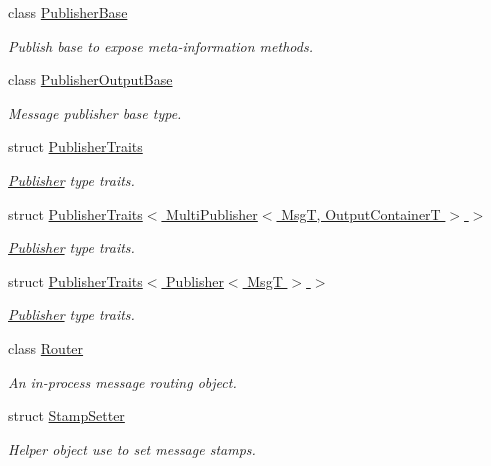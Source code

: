 \begin{DoxyCompactItemize}
class \hyperlink{classflow__ros_1_1_publisher_base}{Publisher\+Base}
\begin{DoxyCompactList}\small\item\em Publish base to expose meta-\/information methods. \end{DoxyCompactList}\item 
class \hyperlink{classflow__ros_1_1_publisher_output_base}{Publisher\+Output\+Base}
\begin{DoxyCompactList}\small\item\em Message publisher base type. \end{DoxyCompactList}\item 
struct \hyperlink{structflow__ros_1_1_publisher_traits}{Publisher\+Traits}
\begin{DoxyCompactList}\small\item\em \hyperlink{classflow__ros_1_1_publisher}{Publisher} type traits. \end{DoxyCompactList}\item 
struct \hyperlink{structflow__ros_1_1_publisher_traits_3_01_multi_publisher_3_01_msg_t_00_01_output_container_t_01_4_01_4}{Publisher\+Traits$<$ Multi\+Publisher$<$ Msg\+T, Output\+Container\+T $>$ $>$}
\begin{DoxyCompactList}\small\item\em \hyperlink{classflow__ros_1_1_publisher}{Publisher} type traits. \end{DoxyCompactList}\item 
struct \hyperlink{structflow__ros_1_1_publisher_traits_3_01_publisher_3_01_msg_t_01_4_01_4}{Publisher\+Traits$<$ Publisher$<$ Msg\+T $>$ $>$}
\begin{DoxyCompactList}\small\item\em \hyperlink{classflow__ros_1_1_publisher}{Publisher} type traits. \end{DoxyCompactList}\item 
class \hyperlink{classflow__ros_1_1_router}{Router}
\begin{DoxyCompactList}\small\item\em An in-\/process message routing object. \end{DoxyCompactList}\item 
struct \hyperlink{structflow__ros_1_1_stamp_setter}{Stamp\+Setter}
\begin{DoxyCompactList}\small\item\em Helper object use to set message stamps. \end{DoxyCompactList}\item 

\end{DoxyCompactItemize}
